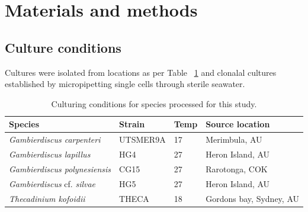 \documentclass[12pt]{article}
\begin{document}
\newpage

\section{Materials and methods}
\subsection*{Culture conditions}
Cultures were isolated from locations as per Table ~\ref{tbl:strainTable} and clonalal cultures established by micropipetting single cells through sterile seawater. 

\FloatBarrier
\begin{table}
\caption{Culturing conditions for species processed for this study.}
\label{tbl:strainTable}
\begin{tabular}{ | p{3cm} | p{2.5cm} | p{1.5cm} | p{5.3cm} |}
\hline
\textbf{Species} & \textbf{Strain}& \textbf{Temp} & \textbf{Source location} \\
\hline
\textit{Gambierdiscus carpenteri}&UTSMER9A&17&Merimbula, AU\\
\hline
\textit{Gambierdiscus lapillus}&HG4&27&Heron Island, AU\\
\hline
\textit{Gambierdiscus polynesiensis}&CG15&27&Rarotonga, COK\\
\hline
\textit{Gambierdiscus} cf. \textit{silvae}&HG5&27&Heron Island, AU\\
\hline
\textit{Thecadinium kofoidii}&THECA&18&Gordons bay, Sydney, AU\\
\hline
\end{tabular}
\end{table}
\FloatBarrier
\end{document}

